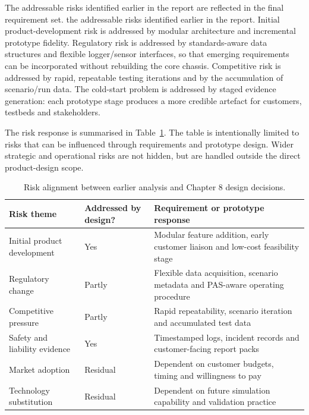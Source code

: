 The addressable risks identified earlier in the report are reflected in the final requirement set. the addressable risks identified earlier in the report. Initial product-development risk is addressed by modular architecture and incremental prototype fidelity. Regulatory risk is addressed by standards-aware data structures and flexible logger/sensor interfaces, so that emerging requirements can be incorporated without rebuilding the core chassis. Competitive risk is addressed by rapid, repeatable testing iterations and by the accumulation of scenario/run data. The cold-start problem is addressed by staged evidence generation: each prototype stage produces a more credible artefact for customers, testbeds and stakeholders.

The risk response is summarised in Table~\ref{tab:ch8_risk_alignment}. The table is intentionally limited to risks that can be influenced through requirements and prototype design. Wider strategic and operational risks are not hidden, but are handled outside the direct product-design scope.

\begin{table}[H]
\centering
\caption{Risk alignment between earlier analysis and Chapter 8 design decisions.}
\label{tab:ch8_risk_alignment}
\begin{tabular}{p{}p{}p{}}
\toprule
\textbf{Risk theme} & \textbf{Addressed by design?} & \textbf{Requirement or prototype response} \\
\midrule
Initial product development & Yes & Modular feature addition, early customer liaison and low-cost feasibility stage \\
\midrule
Regulatory change & Partly & Flexible data acquisition, scenario metadata and PAS-aware operating procedure \\
\midrule
Competitive pressure & Partly & Rapid repeatability, scenario iteration and accumulated test data \\
\midrule
Safety and liability evidence & Yes & Timestamped logs, incident records and customer-facing report packs \\
\midrule
Market adoption & Residual & Dependent on customer budgets, timing and willingness to pay \\
\midrule
Technology substitution & Residual & Dependent on future simulation capability and validation practice \\
\bottomrule
\end{tabular}
\end{table}

